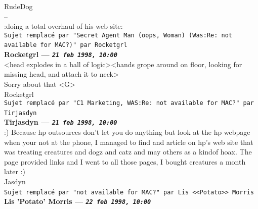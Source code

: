 \documentclass[11pt,twoside,a4paper]{article}
\begin{document}
\begin{multicols*}{2}
RudeDog~\\
-- ~\\
:doing a total overhaul of his web site:~\\

 
		
	
		
\texttt{Sujet remplac{\'e} par "Secret Agent Man (oops, Woman) (Was:Re: not available for MAC?)" par Rocketgrl}~\\
		
	
		
\textbf{Rocketgrl --- \emph{\texttt{21 feb 1998, 10:00}}}~\\

<head explodes in a ball of logic><hands grope around on floor, looking for missing head, and attach it to neck>~\\

Sorry about that <G>~\\

Rocketgrl~\\

 
		
	
		
\texttt{Sujet remplac{\'e} par "C1 Marketing, WAS:Re: not available for MAC?" par Tirjasdyn}~\\
		
	
		
\textbf{Tirjasdyn --- \emph{\texttt{21 feb 1998, 10:00}}}~\\

:)  Because hp outsources don't let you do anything but look at the hp webpage when your not at the phone, I managed to find and article on hp's web site that was treating creatures and dogz and catz and may others as a kindof hoax.  The page provided links and I went to all those pages,  I bought creatures a month later :)~\\

Jasdyn~\\




 
		
	
		
\texttt{Sujet remplac{\'e} par "not available for MAC?" par Lis <<Potato>> Morris}~\\
		
	
		
\textbf{Lis 'Potato' Morris --- \emph{\texttt{22 feb 1998, 10:00}}}~\\


\end{multicols*}
\end{document}
